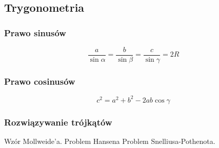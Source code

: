 \subsection{Trygonometria}
\subsubsection{Prawo sinusów}
$$\frac{a}{\sin \alpha} = \frac{b}{\sin \beta} = \frac{c}{\sin \gamma} = 2R$$

\subsubsection{Prawo cosinusów}
$$c^2 = a^2 + b^2 - 2ab \cos \gamma$$


\subsubsection{Rozwiązywanie trójkątów}
Wzór Mollweide'a.
%
Problem Hansena
%
Problem Snelliusa-Pothenota.
%
